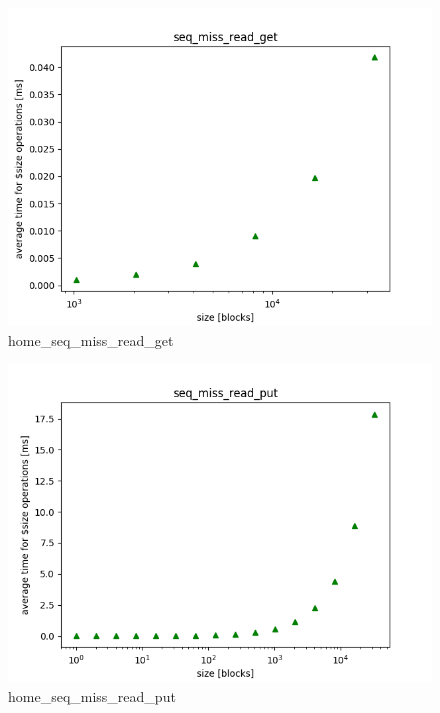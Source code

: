 \documentclass[twocolumn,11pt]{article}
\begin{document}
\begin{figure}[H]
  \includegraphics[width=\linewidth]{Pictures/HOMEPC/seq_miss_read_complete_get.png}
  \caption{home\_seq\_miss\_read\_get}
  \label{fig:home_seq_miss_read_get}
\end{figure}
\begin{figure}[H]
  \includegraphics[width=\linewidth]{Pictures/HOMEPC/seq_miss_read_complete_put.png}
  \caption{home\_seq\_miss\_read\_put}
  \label{fig:home_seq_miss_read_put}
\end{figure}
\end{document}
